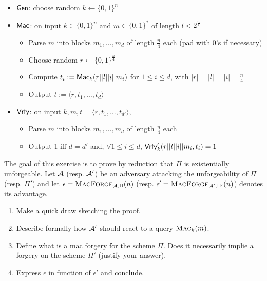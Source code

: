 \begin{itemize}
%
\item $\operatorname{\mathsf{Gen}}$: choose random $k\leftarrow \{0,1\}^n$
\item $\operatorname{\mathsf{Mac}}$: on input $k \in\{0,1\}^n$ and $m \in \{0,1\}^*$ of length $l<2^\frac n4$
\begin{itemize}
\item Parse $m$ into blocks $m_1,\ldots,m_d$ of length $\frac n4$ each (pad with 0's if necessary)
\item Choose random $r\leftarrow \{0,1\}^\frac n4$
\item Compute $t_i:=\operatorname{\mathsf{Mac}}_k(r||l||i||m_i)$ for $1\leq i\leq d$, with $|r|=|l|=|i|=\frac n4$
\item Output $t:=\langle r,t_1,\ldots,t_d\rangle$
\end{itemize}
\item $\operatorname{\mathsf{Vrfy}}$: on input $k, m, t=\langle r,t_1,\ldots,t_{d'}\rangle$,
\begin{itemize}
\item Parse $m$ into blocks $m_1,\ldots,m_d$ of length $\frac n4$ each
\item Output 1 iff $d=d'$ and, $\forall 1\leq i\leq d$, $\operatorname{\mathsf{Vrfy}}'_k(r||l||i||m_i,t_i)=1$
\end{itemize}
%
\end{itemize}

The goal of this exercise is to prove by reduction that $\Pi$ is existentially unforgeable. Let $\mathcal{A}$ (resp. $\mathcal{A}'$) be an adversary attacking the unforgeability of $\Pi$ (resp. $\Pi'$) and let $\epsilon = \textsc{MacForge}_{\mathcal{A},\Pi}(n)$ (resp. $\epsilon' = \textsc{MacForge}_{\mathcal{A}',\Pi'}(n)$) denotes its advantage.

\begin{enumerate}
  \item Make a quick draw sketching the proof.
  \item Describe formally how $\mathcal{A}'$ should react to a query $\textsc{Mac}_k(m)$.
  \item Define what is a mac forgery for the scheme $\Pi$. Does it necessarily implie a forgery on the scheme $\Pi'$ (justify your answer).
  \item Express $\epsilon$ in function of $\epsilon'$ and conclude.
\end{enumerate}

